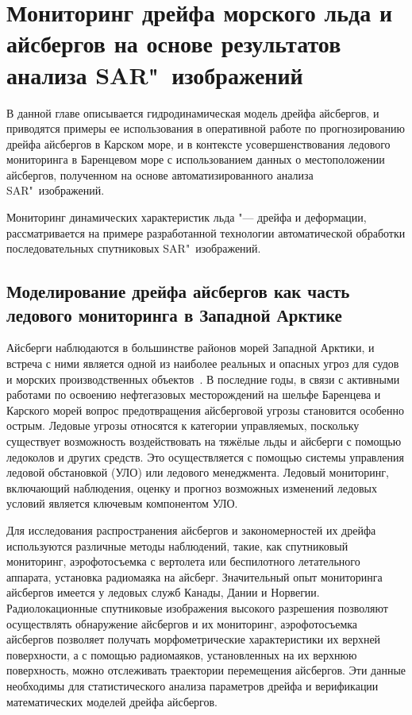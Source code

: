 \chapter{Мониторинг дрейфа морского льда и айсбергов на основе результатов анализа SAR"~изображений} \label{chapt4}

В данной главе описывается гидродинамическая модель дрейфа айсбергов, и приводятся примеры ее использования в оперативной работе по прогнозированию дрейфа айсбергов в Карском море, и в контексте усовершенствования ледового мониторинга в Баренцевом море с использованием данных о местоположении айсбергов, полученном на основе автоматизированного анализа SAR"~изображений.

Мониторинг динамических характеристик льда "--- дрейфа и деформации, рассматривается на примере разработанной технологии автоматической обработки последовательных спутниковых SAR"~изображений.

\section{Моделирование дрейфа айсбергов как часть ледового мониторинга в Западной Арктике} \label{sect4_1}

Айсберги наблюдаются в большинстве районов морей Западной Арктики, и встреча с ними является одной из наиболее реальных и опасных угроз для судов и морских производственных объектов~\cite{Mironov_Smirnov_Iceberg_2015}. В последние годы, в связи с активными работами по освоению нефтегазовых месторождений на шельфе Баренцева и Карского морей вопрос предотвращения айсберговой угрозы становится особенно острым. Ледовые угрозы относятся к категории управляемых, поскольку существует возможность воздействовать на тяжёлые льды и айсберги с помощью ледоколов и других средств. Это осуществляется с помощью системы управления ледовой обстановкой (УЛО) или ледового менеджмента. Ледовый мониторинг, включающий наблюдения, оценку и прогноз возможных изменений ледовых условий является ключевым компонентом УЛО.

Для исследования распространения айсбергов и закономерностей их дрейфа 
используются различные методы наблюдений, такие, как спутниковый мониторинг, 
аэрофотосъемка с вертолета или беспилотного летательного аппарата, установка 
радиомаяка на айсберг. Значительный опыт мониторинга айсбергов имеется у ледовых служб Канады, Дании и Норвегии. Радиолокационные спутниковые изображения высокого разрешения позволяют осуществлять обнаружение айсбергов и их мониторинг, аэрофотосъемка айсбергов позволяет получать морфометрические характеристики их верхней поверхности, а с помощью радиомаяков, установленных на их верхнюю поверхность, можно отслеживать траектории перемещения айсбергов. Эти данные необходимы для статистического анализа параметров дрейфа и верификации математических моделей дрейфа айсбергов.

